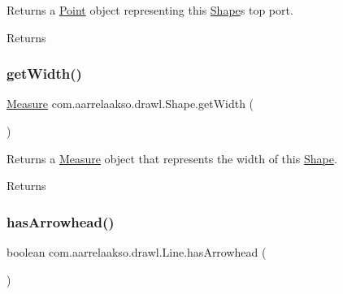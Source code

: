 Returns a \hyperlink{classcom_1_1aarrelaakso_1_1drawl_1_1_point}{Point} object representing this \hyperlink{classcom_1_1aarrelaakso_1_1drawl_1_1_shape}{Shape}\textquotesingle{}s top port. 

\begin{DoxyReturn}{Returns}

\end{DoxyReturn}
\mbox{\label{classcom_1_1aarrelaakso_1_1drawl_1_1_shape_a3e2c58984f1bcbc2e9e86cf30868561e}} 
\subsubsection{\texorpdfstring{get\+Width()}{getWidth()}}
{\footnotesize\ttfamily \hyperlink{classcom_1_1aarrelaakso_1_1drawl_1_1_measure}{Measure} com.\+aarrelaakso.\+drawl.\+Shape.\+get\+Width (\begin{DoxyParamCaption}{ }\end{DoxyParamCaption})\hspace{0.3cm}{\ttfamily [inherited]}}



Returns a \hyperlink{classcom_1_1aarrelaakso_1_1drawl_1_1_measure}{Measure} object that represents the width of this \hyperlink{classcom_1_1aarrelaakso_1_1drawl_1_1_shape}{Shape}. 

\begin{DoxyReturn}{Returns}

\end{DoxyReturn}
\mbox{\label{classcom_1_1aarrelaakso_1_1drawl_1_1_line_a422ac149cee14f3123989e44477d78d2}} 
\subsubsection{\texorpdfstring{has\+Arrowhead()}{hasArrowhead()}}
{\footnotesize\ttfamily boolean com.\+aarrelaakso.\+drawl.\+Line.\+has\+Arrowhead (\begin{DoxyParamCaption}{ }\end{DoxyParamCaption})}

